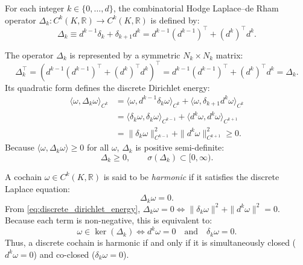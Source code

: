 \begin{definition}
\label{def:discrete_hodge_laplacian}
For each integer $k \in \{0, \dots, d\}$, the combinatorial Hodge Laplace--de Rham operator $\Delta_k : C^k(K, \mathbb{R}) \to C^k(K, \mathbb{R})$ is defined by:
\begin{equation}
\label{eq:hodge_laplacian_def}
\Delta_k \equiv d^{k-1} \delta_k + \delta_{k+1} d^k = d^{k-1} (d^{k-1})^\top + (d^k)^\top d^k.
\end{equation}
\end{definition}

The operator $\Delta_k$ is represented by a symmetric $N_k \times N_k$ matrix:
\begin{equation}
\Delta_k^\top = \left( d^{k-1} (d^{k-1})^\top + (d^k)^\top d^k \right)^\top = d^{k-1} (d^{k-1})^\top + (d^k)^\top d^k = \Delta_k.
\end{equation}
Its quadratic form defines the discrete Dirichlet energy:
\begin{align}
\label{eq:discrete_dirichlet_energy}
\langle \omega, \Delta_k \omega \rangle_{C^k} &= \langle \omega, d^{k-1} \delta_k \omega \rangle_{C^k} + \langle \omega, \delta_{k+1} d^k \omega \rangle_{C^k} \nonumber \\
&= \langle \delta_k \omega, \delta_k \omega \rangle_{C^{k-1}} + \langle d^k \omega, d^k \omega \rangle_{C^{k+1}} \nonumber \\
&= \|\delta_k \omega\|_{C^{k-1}}^2 + \|d^k \omega\|_{C^{k+1}}^2 \ge 0.
\end{align}
Because $\langle \omega, \Delta_k \omega \rangle \ge 0$ for all $\omega$, $\Delta_k$ is positive semi-definite:
\begin{equation}
\Delta_k \ge 0, \qquad \sigma(\Delta_k) \subset [0, \infty).
\end{equation}

A cochain $\omega \in C^k(K, \mathbb{R})$ is said to be \emph{harmonic} if it satisfies the discrete Laplace equation:
\begin{equation}
\Delta_k \omega = 0.
\end{equation}
From \eqref{eq:discrete_dirichlet_energy}, $\Delta_k \omega = 0 \iff \|\delta_k \omega\|^2 + \|d^k \omega\|^2 = 0$. Because each term is non-negative, this is equivalent to:
\begin{equation}
\label{eq:harmonic_condition}
\omega \in \ker(\Delta_k) \iff d^k \omega = 0 \quad \text{and} \quad \delta_k \omega = 0.
\end{equation}
Thus, a discrete cochain is harmonic if and only if it is simultaneously closed ($d^k \omega = 0$) and co-closed ($\delta_k \omega = 0$).

